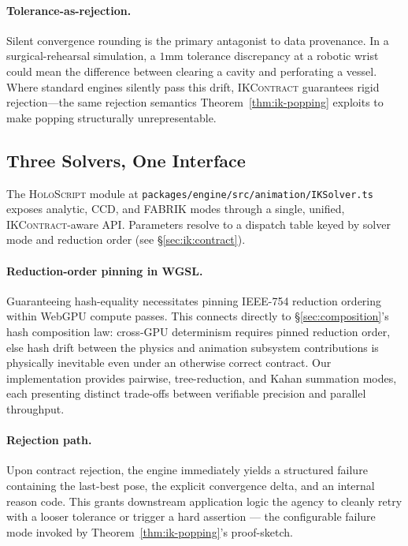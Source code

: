 \documentclass[sigconf,nonacm]{acmart}
\newcommand{\holoscript}{\textsc{HoloScript}}
\newcommand{\ikcontract}{\textsc{IKContract}}
\newcommand{\fabrik}{\textsc{FABRIK}}
\newcommand{\ccd}{\textsc{CCD}}
\begin{document}
\paragraph{Tolerance-as-rejection.}
Silent convergence rounding is the primary antagonist to data provenance.
In a surgical-rehearsal simulation, a $1$mm tolerance discrepancy at a
robotic wrist could mean the difference between clearing a cavity and
perforating a vessel. Where standard engines silently pass this drift,
\ikcontract{} guarantees rigid rejection---the same rejection semantics
Theorem~\ref{thm:ik-popping} exploits to make popping structurally
unrepresentable.

\subsection{Three Solvers, One Interface}
\label{sec:ik:solvers}

The \holoscript{} module at
\texttt{packages/engine/src/animation/IKSolver.ts} exposes analytic,
\ccd{}, and \fabrik{} modes through a single, unified,
\ikcontract{}-aware API. Parameters resolve to a dispatch table keyed
by solver mode and reduction order (see
\S\ref{sec:ik:contract}).

\paragraph{Reduction-order pinning in WGSL.}
Guaranteeing hash-equality necessitates pinning IEEE-754 reduction
ordering within WebGPU compute passes. This connects directly to
\S\ref{sec:composition}'s hash composition law: cross-GPU determinism
requires pinned reduction order, else hash drift between the physics and
animation subsystem contributions is physically inevitable even under an
otherwise correct contract. Our implementation provides pairwise,
tree-reduction, and Kahan summation modes, each presenting distinct
trade-offs between verifiable precision and parallel throughput.

\paragraph{Rejection path.}
Upon contract rejection, the engine immediately yields a structured
failure containing the last-best pose, the explicit convergence delta,
and an internal reason code. This grants downstream application logic
the agency to cleanly retry with a looser tolerance or trigger a hard
assertion --- the configurable failure mode invoked by
Theorem~\ref{thm:ik-popping}'s proof-sketch.
\end{document}
